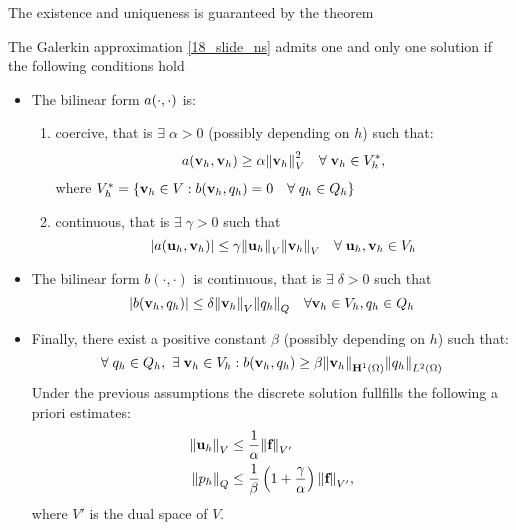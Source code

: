 The existence and uniqueness is guaranteed by the theorem
\begin{theorem}
    The Galerkin approximation \eqref{18_slide_ns} admits one and only one solution if the following conditions hold
    \begin{itemize}
        \item The bilinear form \(a(\cdot, \cdot)\) is:
        \begin{enumerate}
            \item coercive, that is \(\exists \; \alpha > 0\) (possibly depending on \(h\)) such that:
            \[
                a(\textbf{v}_h, \textbf{v}_h) \geq \alpha \norm{\textbf{v}_h}^2_V \quad \forall\; \textbf{v}_h \in V_h^*,
            \]
            where \(V_h^* = \left\{ \textbf{v}_h \in V : b(\textbf{v}_h,q_h) = 0 \quad \forall \; q_h \in Q_h \right\}\)
            \item continuous, that is \(\exists \; \gamma > 0\) such that 
            \[
                \abs{a(\textbf{u}_h,\textbf{v}_h)} \leq \gamma \norm{\textbf{u}_h}_V \norm{\textbf{v}_h}_V \quad \forall \; \textbf{u}_h,\textbf{v}_h \in V_h     
            \]
        \end{enumerate}
        \item The bilinear form \(b(\cdot, \cdot)\) is continuous, that is \(\exists \; \delta > 0\) such that 
        \[
            \abs{b(\textbf{v}_h, q_h)} \leq \delta \norm{\textbf{v}_h}_V\norm{q_h}_Q \quad \forall \textbf{v}_h \in V_h, q_h \in Q_h
        \]
        \item Finally, there exist a positive constant \(\beta\) (possibly depending on \(h\)) such that:
        \begin{equation}
            \forall \; q_h \in Q_h, \ \exists \; \vvec_h \in V_h : b(\vvec_h, q_h) \geq \beta \norm{\vvec_h}_{\vect{H}^1(\Omega)}\ltwonorm{q_h}
            \label{19_slide_ns}
        \end{equation}
        Under the previous assumptions the discrete solution fullfills the following a priori estimates: 
        \begin{align*}
            \norm{\textbf{u}_h}_V &\leq \frac{1}{\alpha} \norm{\textbf{f}}_{V'} \\
            \norm{p_h}_Q &\leq \frac{1}{\beta} \left( 1+\frac{\gamma}{\alpha} \right) \norm{\textbf{f}}_{V'},
        \end{align*}
        where \(V'\) is the dual space of \(V\).


\end{itemize}
\end{theorem}
